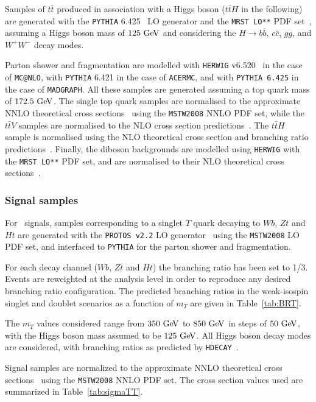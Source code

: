 Samples of $t\bar{t}$ produced in association with a Higgs boson
($t\bar{t}H$ in the following) are generated with the 
{\tt PYTHIA} 6.425~\cite{py6} LO generator and the {\tt MRST LO**} PDF set~\cite{mrst},
assuming a Higgs boson mass of $125\gev$ and considering the 
$H\to b\bar{b}$, $c\bar{c}$, $gg$, and $W^+W^-$ decay modes.

Parton shower and fragmentation are modelled with {\tt HERWIG}
v6.520~\cite{HERWIG} in the case of {\tt MC@NLO}, with {\tt PYTHIA}
6.421 in the case of {\tt ACERMC}, and with {\tt PYTHIA 6.425} in the
case of {\tt MADGRAPH}.  All these samples are generated assuming a top
quark mass of $172.5\gev$. The single top quark samples are normalised to
the approximate NNLO theoretical cross sections~\cite{stopxs,stopxs_2}
using the {\tt MSTW2008} NNLO PDF set, while the $t\bar{t}V$ samples
are normalised to the NLO cross section predictions~\cite{ttbarVxs1,ttbarVxs2}.
The $t\bar{t}H$ sample is normalised using the NLO theoretical cross section 
and branching ratio predictions~\cite{lhcxs}.
Finally, the diboson backgrounds are modelled using {\tt HERWIG} with
the {\tt MRST LO**} PDF set, and are normalised to their NLO
theoretical cross sections~\cite{dibosonxs}.

\subsubsection{Signal samples}\label{subsec:MCsignal}

For \T\ signals, samples corresponding to a singlet $T$ quark 
decaying to $Wb$, $Zt$ and $Ht$ are generated with the {\tt PROTOS v2.2} 
LO generator~\cite{AguilarSaavedra:2009es,protos} 
using the  {\tt MSTW2008} LO PDF set, and interfaced to {\tt PYTHIA} for 
the parton shower and fragmentation. 

For each decay channel ($Wb$, $Zt$ and $Ht$) the branching ratio has been 
set to 1/3. Events are reweighted at the analysis level
in order to reproduce any desired branching ratio configuration. 
The predicted branching ratios in the weak-isospin singlet and doublet scenarios as 
a function of $m_{T}$ are given in Table~\ref{tab:BRT}.

The $m_{T}$ values considered range from $350\gev$ to $850\gev$ in steps of $50\gev$, 
with the Higgs boson mass assumed 
to be $125\gev$. All Higgs boson decay modes are considered, 
with branching ratios as predicted by {\tt HDECAY}~\cite{hdecay}.

Signal samples are normalized to the approximate NNLO theoretical cross sections~\cite{ttbarxs} using the {\tt MSTW2008} NNLO PDF set.
The cross section values used are summarized in Table~\ref{tab:sigmaTT}.



